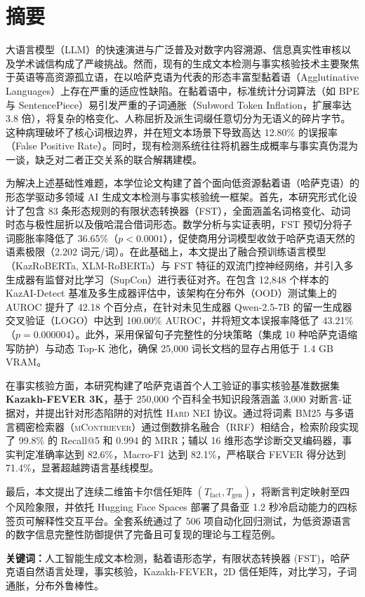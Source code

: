 {\zhfont
\section*{\zhfont 摘要}

大语言模型（LLM）的快速演进与广泛普及对数字内容溯源、信息真实性审核以及学术诚信构成了严峻挑战。然而，现有的生成文本检测与事实核验技术主要聚焦于英语等高资源孤立语，在以哈萨克语为代表的形态丰富型黏着语（Agglutinative Languages）上存在严重的适应性缺陷。在黏着语中，标准统计分词算法（如 BPE 与 SentencePiece）易引发严重的子词通胀（Subword Token Inflation，扩展率达 3.8 倍），将复杂的格变化、人称屈折及派生词缀任意切分为无语义的碎片字节。这种病理破坏了核心词根边界，并在短文本场景下导致高达 12.80\% 的误报率（False Positive Rate）。同时，现有检测系统往往将机器生成概率与事实真伪混为一谈，缺乏对二者正交关系的联合解耦建模。

为解决上述基础性难题，本学位论文构建了首个面向低资源黏着语（哈萨克语）的形态学驱动多领域 AI 生成文本检测与事实核验统一框架。首先，本研究形式化设计了包含 83 条形态规则的有限状态转换器（FST），全面涵盖名词格变化、动词时态与极性屈折以及俄哈混合借词形态。数学分析与实证表明，FST 预切分将子词膨胀率降低了 36.65\%（$p < 0.0001$），促使商用分词模型收敛于哈萨克语天然的语素极限（2.202 词元/词）。在此基础上，本文提出了融合预训练语言模型（KazRoBERTa, XLM-RoBERTa）与 FST 特征的双流门控神经网络，并引入多生成器有监督对比学习（SupCon）进行表征对齐。在包含 12,848 个样本的 KazAI-Detect 基准及多生成器评估中，该架构在分布外（OOD）测试集上的 AUROC 提升了 42.18 个百分点，在针对未见生成器 Qwen-2.5-7B 的留一生成器交叉验证（LOGO）中达到 100.00\% AUROC，并将短文本误报率降低了 43.21\%（$p = 0.000004$）。此外，采用保留句子完整性的分块策略（集成 10 种哈萨克语缩写防护）与动态 Top-K 池化，确保 25,000 词长文档的显存占用低于 1.4 GB VRAM。

在事实核验方面，本研究构建了哈萨克语首个人工验证的事实核验基准数据集 \textbf{Kazakh-FEVER 3K}，基于 250,000 个百科全书知识段落涵盖 3,000 对断言-证据对，并提出针对形态陷阱的对抗性 \textsc{Hard NEI} 协议。通过将词素 BM25 与多语言稠密检索器（\textsc{mContriever}）通过倒数排名融合（RRF）相结合，检索阶段实现了 99.8\% 的 Recall@5 和 0.994 的 MRR；辅以 16 维形态学诊断交叉编码器，事实判定准确率达到 82.6\%，Macro-F1 达到 82.1\%，严格联合 FEVER 得分达到 71.4\%，显著超越跨语言基线模型。

最后，本文提出了连续二维笛卡尔信任矩阵 $(T_{\text{fact}}, T_{\text{gen}})$，将断言判定映射至四个风险象限，并依托 Hugging Face Spaces 部署了具备亚 1.2 秒冷启动能力的四标签页可解释性交互平台。全套系统通过了 506 项自动化回归测试，为低资源语言的数字信息完整性防御提供了完备且可复现的理论与工程范例。

\vspace{0.8em}
\noindent\textbf{关键词：}人工智能生成文本检测，黏着语形态学，有限状态转换器 (FST)，哈萨克语自然语言处理，事实核验，Kazakh-FEVER，2D 信任矩阵，对比学习，子词通胀，分布外鲁棒性。
}
